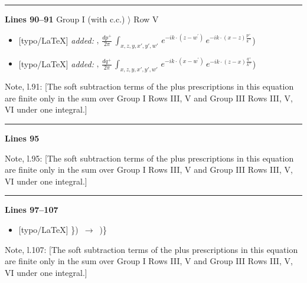 \documentclass[10pt]{article}
\newenvironment{notebox}{\def\FrameCommand{{\color{notebar}\vrule width 1.5pt}\hspace{6pt}}\MakeFramed{\advance\hsize-\width\FrameRestore}\small}{\endMakeFramed}
\begin{document}
\noindent\rule{\linewidth}{0.3pt}\par\noindent\textbf{Lines 90--91} \quad \textsf{Group I (with c.c.) $\rangle$ Row V} \par
\begin{itemize}[leftmargin=2.2em,itemsep=1pt,topsep=2pt]
\item[\textbf{l.90}] \textsf{\small [typo/LaTeX]} \emph{added:} $\displaystyle ,$$\displaystyle \, \frac{dp^{+}}{2\pi}\,\int_{x,z,y,x',y',w'}\,e^{-ik\cdot (z-w^\prime)}\,e^{-ik\cdot (x-z)\frac{p^{+}}{k^{+}}}${\color{gray}\small)}
\item[\textbf{l.90}] \textsf{\small [typo/LaTeX]} \emph{added:} $\displaystyle ,$$\displaystyle \, \frac{dq^{+}}{2\pi}\,\int_{x,z,y,x',y',w'}\,e^{-ik\cdot (x-w^\prime)}\,e^{-ik\cdot (z-x)\frac{q^{+}}{k^{+}}}${\color{gray}\small)}
\end{itemize}
\begin{notebox}\textsf{\small Note, l.91:} [The soft subtraction terms of the plus prescriptions in this equation are finite only in the sum over Group I Rows III, V and Group III Rows III, V, VI under one integral.]\end{notebox}
\noindent\rule{\linewidth}{0.3pt}\par\noindent\textbf{Lines 95}\par
\begin{notebox}\textsf{\small Note, l.95:} [The soft subtraction terms of the plus prescriptions in this equation are finite only in the sum over Group I Rows III, V and Group III Rows III, V, VI under one integral.]\end{notebox}
\noindent\rule{\linewidth}{0.3pt}\par\noindent\textbf{Lines 97--107} \par
\begin{itemize}[leftmargin=2.2em,itemsep=1pt,topsep=2pt]
\item[\textbf{l.97}] \textsf{\small [typo/LaTeX]} {\small\ttfamily \}\allowbreak{})\allowbreak{}}\ $\longrightarrow$\ {\small\ttfamily )\allowbreak{}\}\allowbreak{}}
\end{itemize}
\begin{notebox}\textsf{\small Note, l.107:} [The soft subtraction terms of the plus prescriptions in this equation are finite only in the sum over Group I Rows III, V and Group III Rows III, V, VI under one integral.]\end{notebox}
\end{document}
